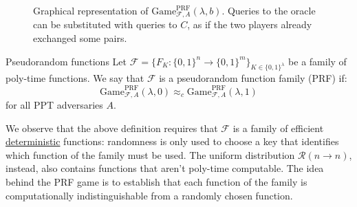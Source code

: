 \documentclass[a4paper, 12pt]{report}
\begin{document}
    \begin{figure}[H]
        \centering


        \caption{Graphical representation of $\mathrm{Game}_{\mathcal{F}, A}^{\text{PRF}}(\lambda, b)$. Queries to the oracle can be substituted with queries to $C$, as if the two players already exchanged some pairs.}
    \end{figure}

    \begin{frameddefn}{Pseudorandom functions}
        Let $\mathcal{F} = \{F_K : \{0,1\}^n \to \{0,1\}^m\}_{K \in \{0,1\}^\lambda}$ be a family of poly-time functions. We say that $\mathcal{F}$ is a pseudorandom function family (PRF) if:
        \[\mathrm{Game}_{\mathcal{F},A}^{\text{PRF}}(\lambda, 0) \approx_c \mathrm{Game}_{\mathcal{F},A}^{\text{PRF}}(\lambda, 1)\]
        for all PPT adversaries $A$.
    \end{frameddefn}

    We observe that the above definition requires that $\mathcal{F}$ is a family of efficient \underline{deterministic} functions: randomness is only used to choose a key that identifies which function of the family must be used. The uniform distribution $\mathcal{R}(n \to n)$, instead, also contains functions that aren't poly-time computable. The idea behind the PRF game is to establish that each function of the family is computationally indistinguishable from a randomly chosen function.
\end{document}
